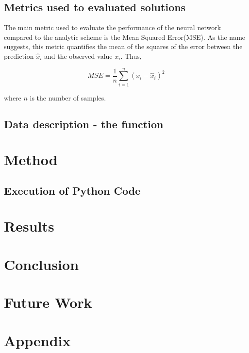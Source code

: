 \documentclass[a4paper,11pt,twocolumn]{article}
\begin{document}
\subsection{Metrics used to evaluated solutions}

The main metric used to evaluate the performance of the neural network compared to the analytic scheme is the Mean Squared Error(MSE). As the name suggests, this metric quantifies the mean of the squares of the error between the prediction $\hat{x}_i$ and the observed value $x_i$. Thus, 

\begin{equation*}
MSE = \frac{1}{n}\sum_{i=1}^n (x_i - \hat{x}_i)^2
\end{equation*}

where $n$ is the number of samples.
 
\subsection{Data description - the function}

\section{Method}

\subsection{Execution of Python Code}


\section{Results}
      

\section{Conclusion}


\section{Future Work}

\section{Appendix}
\end{document}
